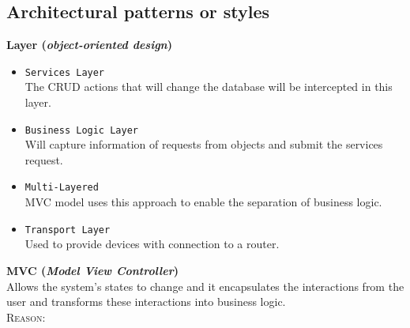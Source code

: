 \documentclass[a4paper,12pt]{article}
\begin{document}
\subsection{Architectural patterns or styles}
 \textbf{Layer (\textit{object-oriented design})}
\begin{itemize}
\item \texttt{Services Layer}\\
The CRUD actions that will change the database will be intercepted in this layer.
\item \texttt{Business Logic Layer}\\
Will capture information of requests from objects and submit the services request.
\item\texttt{Multi-Layered}\\
MVC model uses this approach to enable the separation of business logic.
\item \texttt{Transport Layer}\\
Used to provide devices with connection to a router.
\end{itemize}
\textbf{MVC (\textit{Model View Controller})}\\
Allows the system's states to change and it encapsulates the interactions
from the user and transforms these interactions into business logic.\\
\textsc{Reason:}
\end{document}
